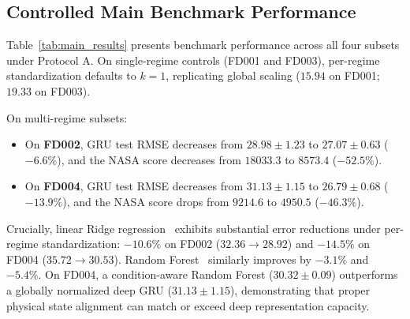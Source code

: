 \documentclass[conference]{IEEEtran}
\begin{document}
\subsection{Controlled Main Benchmark Performance}
Table~\ref{tab:main_results} presents benchmark performance across all four subsets under Protocol A. On single-regime controls (FD001 and FD003), per-regime standardization defaults to $k=1$, replicating global scaling ($15.94$ on FD001; $19.33$ on FD003).

On multi-regime subsets:
\begin{itemize}
    \item On \textbf{FD002}, GRU test RMSE decreases from $28.98 \pm 1.23$ to $27.07 \pm 0.63$ ($-6.6\%$), and the NASA score decreases from $18033.3$ to $8573.4$ ($-52.5\%$).
    \item On \textbf{FD004}, GRU test RMSE decreases from $31.13 \pm 1.15$ to $26.79 \pm 0.68$ ($-13.9\%$), and the NASA score drops from $9214.6$ to $4950.5$ ($-46.3\%$).
\end{itemize}

Crucially, linear Ridge regression~\cite{hoerl1970ridge} exhibits substantial error reductions under per-regime standardization: $-10.6\%$ on FD002 ($32.36 \to 28.92$) and $-14.5\%$ on FD004 ($35.72 \to 30.53$). Random Forest~\cite{breiman2001random} similarly improves by $-3.1\%$ and $-5.4\%$. On FD004, a condition-aware Random Forest ($30.32 \pm 0.09$) outperforms a globally normalized deep GRU ($31.13 \pm 1.15$), demonstrating that proper physical state alignment can match or exceed deep representation capacity.
\end{document}
